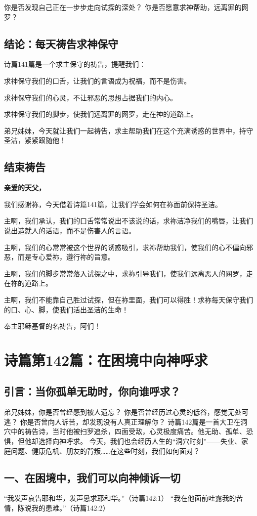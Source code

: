 \documentclass[a4paper, 12pt]{article}
\begin{document}
你是否发现自己正在一步步走向试探的深处？
你是否愿意求神帮助，远离罪的网罗？
\subsection*{结论：每天祷告求神保守}
诗篇141篇是一个求主保守的祷告，提醒我们：

求神保守我们的口舌，让我们的言语成为祝福，而不是伤害。

求神保守我们的心灵，不让邪恶的思想占据我们的内心。

求神保守我们的脚步，使我们远离罪的网罗，走在神的道路上。

弟兄姊妹，今天就让我们一起祷告，求主帮助我们在这个充满诱惑的世界中，持守圣洁，紧紧跟随他！

\subsection*{结束祷告}
\textbf{亲爱的天父，}

我们感谢祢，今天借着诗篇141篇，让我们学会如何在祢面前保持圣洁。

主啊，我们承认，我们的口舌常常说出不该说的话，求祢洁净我们的嘴唇，让我们说出造就人的话语，而不是伤害人的言语。

主啊，我们的心常常被这个世界的诱惑吸引，求祢帮助我们，使我们的心不偏向邪恶，而是专心爱祢，遵行祢的旨意。

主啊，我们的脚步常常落入试探之中，求祢引导我们，使我们远离恶人的网罗，走在祢的道路上。

主啊，我们不能靠自己胜过试探，但在祢里面，我们可以得胜！求祢每天保守我们的口、心、脚，使我们活出圣洁的生命！

奉主耶稣基督的名祷告，阿们！
\newpage
\section{诗篇第142篇：在困境中向神呼求}
\subsection*{引言：当你孤单无助时，你向谁呼求？}
弟兄姊妹，你是否曾经感到被人遗忘？
你是否曾经历过心灵的低谷，感觉无处可逃？
你是否曾向人诉苦，却发现没有人真正理解你？
诗篇142篇是一首大卫在洞穴中的祷告诗，当时他被扫罗追杀，四面受敌，心灵极度痛苦。他无助、孤单、恐惧，但他却选择向神呼求。
今天，我们也会经历人生的“洞穴时刻”——失业、家庭问题、健康危机、朋友的背叛……在这些时刻，我们如何面对？
\subsection*{一、在困境中，我们可以向神倾诉一切}
“我发声哀告耶和华，发声恳求耶和华。”（诗篇142:1）
“我在他面前吐露我的苦情，陈说我的患难。”（诗篇142:2）
\end{document}
